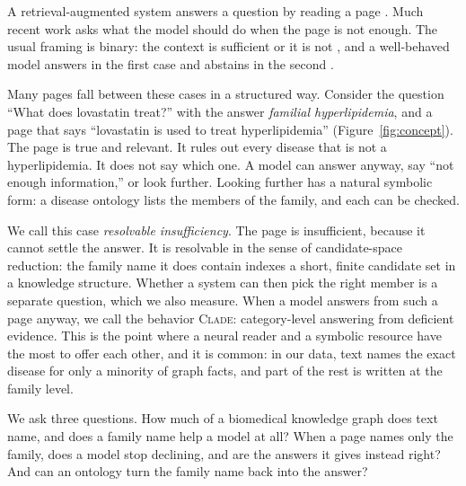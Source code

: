 \documentclass[letterpaper]{article} %
\newcommand{\clade}{\textsc{Clade}}
\begin{document}
A retrieval-augmented system answers a question by reading a page
\citep{lewis2020rag}. Much recent work asks what the model should do when the
page is not enough. The usual framing is binary: the context is sufficient or
it is not \citep{joren2025sufficient}, and a well-behaved model answers in the
first case and abstains in the second \citep{wen2025abstention}.

Many pages fall between these cases in a structured way. Consider the question
``What does lovastatin treat?'' with the answer \emph{familial
hyperlipidemia}, and a page that says ``lovastatin is used to treat
hyperlipidemia'' (Figure~\ref{fig:concept}). The page is true and relevant. It
rules out every disease that is not a hyperlipidemia. It does not say which
one. A model can answer anyway, say ``not enough information,'' or look
further. Looking further has a natural symbolic form: a disease ontology lists
the members of the family, and each can be checked.

We call this case \emph{resolvable insufficiency}. The page is insufficient,
because it cannot settle the answer. It is resolvable in the sense of candidate-space reduction: the family name
it does contain indexes a short, finite candidate set in a knowledge
structure. Whether a system can then pick the right member is a separate
question, which we also measure. When a model answers from such a page anyway,
we call the behavior \clade{}: category-level answering from deficient
evidence. This is the point where a neural reader and a symbolic resource
have the most to offer each other, and it is common: in our data, text names
the exact disease for only a minority of graph facts, and part of the rest is
written at the family level.

We ask three questions. How much of a biomedical knowledge graph does text
name, and does a family name help a model at all? When a page names only the
family, does a model stop declining, and are the answers it gives instead
right? And can an ontology turn the family name back into the answer?
\end{document}
